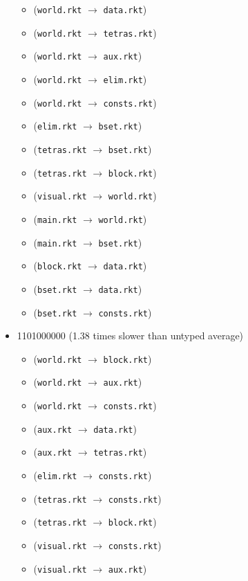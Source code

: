 \documentclass{article}
\newcommand{\mono}[1]{\texttt{#1}}
\begin{document}
\begin{itemize}
  \begin{itemize}
  \item (\mono{world.rkt} $\rightarrow$ \mono{data.rkt})
  \item (\mono{world.rkt} $\rightarrow$ \mono{tetras.rkt})
  \item (\mono{world.rkt} $\rightarrow$ \mono{aux.rkt})
  \item (\mono{world.rkt} $\rightarrow$ \mono{elim.rkt})
  \item (\mono{world.rkt} $\rightarrow$ \mono{consts.rkt})
  \item (\mono{elim.rkt} $\rightarrow$ \mono{bset.rkt})
  \item (\mono{tetras.rkt} $\rightarrow$ \mono{bset.rkt})
  \item (\mono{tetras.rkt} $\rightarrow$ \mono{block.rkt})
  \item (\mono{visual.rkt} $\rightarrow$ \mono{world.rkt})
  \item (\mono{main.rkt} $\rightarrow$ \mono{world.rkt})
  \item (\mono{main.rkt} $\rightarrow$ \mono{bset.rkt})
  \item (\mono{block.rkt} $\rightarrow$ \mono{data.rkt})
  \item (\mono{bset.rkt} $\rightarrow$ \mono{data.rkt})
  \item (\mono{bset.rkt} $\rightarrow$ \mono{consts.rkt})
  \end{itemize}
\item 1101000000 (1.38 times slower than untyped average)
  \begin{itemize}
  \item (\mono{world.rkt} $\rightarrow$ \mono{block.rkt})
  \item (\mono{world.rkt} $\rightarrow$ \mono{aux.rkt})
  \item (\mono{world.rkt} $\rightarrow$ \mono{consts.rkt})
  \item (\mono{aux.rkt} $\rightarrow$ \mono{data.rkt})
  \item (\mono{aux.rkt} $\rightarrow$ \mono{tetras.rkt})
  \item (\mono{elim.rkt} $\rightarrow$ \mono{consts.rkt})
  \item (\mono{tetras.rkt} $\rightarrow$ \mono{consts.rkt})
  \item (\mono{tetras.rkt} $\rightarrow$ \mono{block.rkt})
  \item (\mono{visual.rkt} $\rightarrow$ \mono{consts.rkt})
  \item (\mono{visual.rkt} $\rightarrow$ \mono{aux.rkt})

\end{itemize}
\end{itemize}
\end{document}

